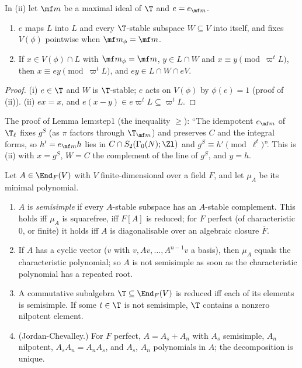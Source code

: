 \begin{proposition}\label{prop:modules:idempotent-congruence}
In (ii) let $\mf m$ be a maximal ideal of $\T$ and $e=e_{\mf m}$.
\begin{enumerate}[label=(\roman*)]
\item $e$ maps $L$ into $L$ and every $\T$-stable subspace $W\subseteq V$ into itself, and fixes $V(\phi)$ pointwise when $\mf m_\phi=\mf m$.
\item If $x\in V(\phi)\cap L$ with $\mf m_\phi=\mf m$, $y\in L\cap W$ and $x\equiv y\pmod{\varpi^tL}$, then $x\equiv ey\pmod{\varpi^tL}$, and $ey\in L\cap W\cap eV$.
\end{enumerate}
\end{proposition}

\begin{proof}
(i) $e\in\T$ and $W$ is $\T$-stable; $e$ acts on $V(\phi)$ by $\phi(e)=1$ (proof of (ii)). (ii) $ex=x$, and $e(x-y)\in e\varpi^tL\subseteq\varpi^tL$.
\end{proof}

\begin{paperlink}\label{pl:modules:projection}
The proof of Lemma lem:step1 (the inequality $\ge$): ``The idempotent $e_{\mf m}$ of $\T_\ell$ fixes $g^S$ (as $\pi$ factors through $\T_{\mf m}$) and preserves
$C$ and the integral forms, so $h'=e_{\mf m}h$ lies in $C\cap S_2(\Gamma_0(N);\Zl)$ and $g^S\equiv h'\pmod{\ell^t}$''. This is (ii) with
$x=g^S$, $W=C$ the complement of the line of $g^S$, and $y=h$.
\end{paperlink}

\begin{proposition}\label{prop:modules:semisimple-operators}
Let $A\in\End_F(V)$ with $V$ finite-dimensional over a field $F$, and let $\mu_A$ be its minimal polynomial.
\begin{enumerate}[label=(\roman*)]
\item $A$ is \emph{semisimple} if every $A$-stable subspace has an $A$-stable complement. This holds iff $\mu_A$ is squarefree, iff $F[A]$ is reduced; for $F$ perfect
(of characteristic $0$, or finite) it holds iff $A$ is diagonalisable over an algebraic closure $\overline F$.
\item If $A$ has a cyclic vector ($v$ with $v,Av,\dots,A^{n-1}v$ a basis), then $\mu_A$ equals the characteristic polynomial; so $A$ is not semisimple as soon as
the characteristic polynomial has a repeated root.
\item A commutative subalgebra $\T\subseteq\End_F(V)$ is reduced iff each of its elements is semisimple. If some $t\in\T$ is not semisimple, $\T$ contains a nonzero
nilpotent element.
\item (Jordan-Chevalley.) For $F$ perfect, $A=A_s+A_n$ with $A_s$ semisimple, $A_n$ nilpotent, $A_sA_n=A_nA_s$, and $A_s$, $A_n$ polynomials in $A$; the decomposition is
unique.
\end{enumerate}
\end{proposition}

